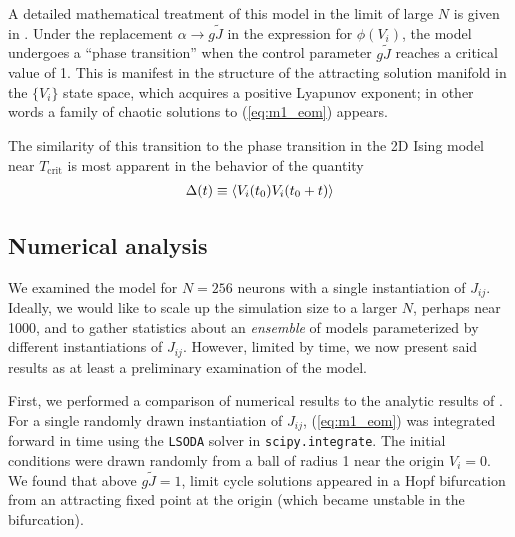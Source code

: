 \documentclass{article} %
\begin{document}
A detailed mathematical treatment of this model in the limit of large $N$ is given in \cite{Sompolinsky1988}.  Under the replacement $\alpha \rightarrow g\tilde{J}$ in the expression for $\phi(V_i)$, the model undergoes a ``phase transition'' when the control parameter $g\tilde{J}$ reaches a critical value of 1.  This is manifest in the structure of the attracting solution manifold in the $\{V_i\}$ state space, which acquires a positive Lyapunov exponent; in other words a family of chaotic solutions to (\ref{eq:m1_eom}) appears.

The similarity of this transition to the phase transition in the 2D Ising model near $T_\text{crit}$ is most apparent in the behavior of the quantity
\begin{align}
	\Delta(t) \equiv \left\langle V_i(t_0) V_i(t_0 + t) \right\rangle \label{eq:m1_Cteq}
\end{align}

\subsection{Numerical analysis}
We examined the model for $N=256$ neurons with a single instantiation of $J_{ij}$.  Ideally, we would like to scale up the simulation size to a larger $N$, perhaps near 1000, and to gather statistics about an \emph{ensemble} of models parameterized by different instantiations of $J_{ij}$.  However, limited by time, we now present said results as at least a preliminary examination of the model.

First, we performed a comparison of numerical results to the analytic results of \cite{Sompolinsky1988}.  For a single randomly drawn instantiation of $J_{ij}$, (\ref{eq:m1_eom}) was integrated forward in time using the \texttt{LSODA} solver in \texttt{scipy.integrate}.  The initial conditions were drawn randomly from a ball of radius 1 near the origin $V_i=0$.  We found that above $g\tilde{J}=1$, limit cycle solutions appeared in a Hopf bifurcation from an attracting fixed point at the origin (which became unstable in the bifurcation).




\end{document}
